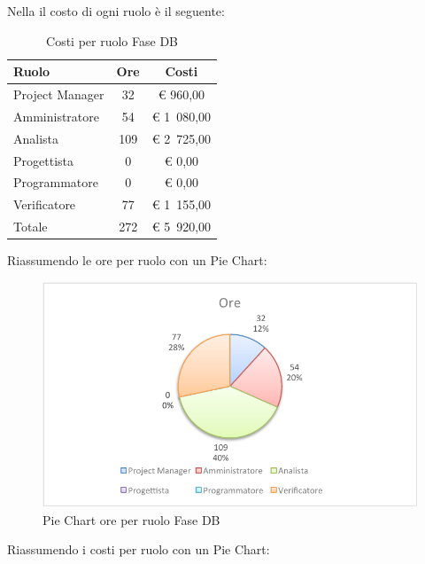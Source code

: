 				Nella  il costo di ogni ruolo è il seguente:
				\begin{table}[H]
					\begin{center}
						\begin{tabular}{| l | c | c |}
							\hline
							Ruolo 				& Ore 		& Costi  \\ \hline
							
							Project Manager		& 32 		& \euro{} 960,00 	\\
							Amministratore 		& 54 		& \euro{} 1~080,00 	\\
							Analista	 		& 109 		& \euro{} 2~725,00 	\\
							Progettista 		& 0			& \euro{} 0,00 	\\
							Programmatore		& 0			& \euro{} 0,00	\\
							Verificatore		& 77 		& \euro{} 1~155,00 	\\ \hline \hline
							
							Totale	 			& 272 		& \euro{} 5~920,00 	\\ \hline
						\end{tabular}
					\end{center}
					\caption{Costi per ruolo Fase DB}
				\end{table}
				Riassumendo le ore per ruolo con un Pie Chart:
				\begin{figure}[H]\centering
					\includegraphics[width=\textwidth]{PianoDiProgetto/Pics/ChartTotOreFaseDB.pdf}
					\caption{Pie Chart ore per ruolo Fase DB}
				\end{figure}
				Riassumendo i costi per ruolo con un Pie Chart:
